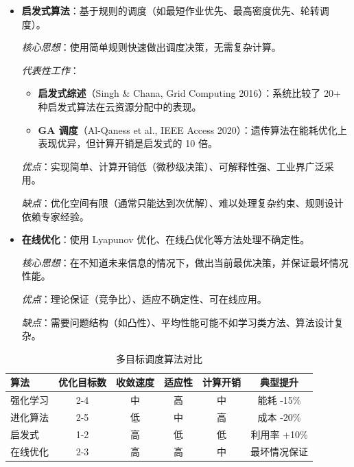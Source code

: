 \documentclass[12pt,a4paper]{article}
\begin{document}
\begin{itemize}
    \textit{优点}：可处理多目标、全局搜索能力强、不依赖梯度、可处理离散和连续变量。
    
    \textit{缺点}：计算开销大（需评估大量候选解）、收敛慢（通常需 100-1000 代）、难以在线应用、参数调优复杂。
    
    \item \textbf{启发式算法}：基于规则的调度（如最短作业优先、最高密度优先、轮转调度）。
    
    \textit{核心思想}：使用简单规则快速做出调度决策，无需复杂计算。
    
    \textit{代表性工作}：
    \begin{itemize}
        \item \textbf{启发式综述}（Singh \& Chana, Grid Computing 2016）：系统比较了 20+ 种启发式算法在云资源分配中的表现\cite{singh2016survey}。
        \item \textbf{GA 调度}（Al-Qaness et al., IEEE Access 2020）：遗传算法在能耗优化上表现优异，但计算开销是启发式的 10 倍\cite{alqaness2020energy}。
    \end{itemize}
    
    \textit{优点}：实现简单、计算开销低（微秒级决策）、可解释性强、工业界广泛采用。
    
    \textit{缺点}：优化空间有限（通常只能达到次优解）、难以处理复杂约束、规则设计依赖专家经验。
    
    \item \textbf{在线优化}：使用 Lyapunov 优化、在线凸优化等方法处理不确定性。
    
    \textit{核心思想}：在不知道未来信息的情况下，做出当前最优决策，并保证最坏情况性能。
    
    \textit{优点}：理论保证（竞争比）、适应不确定性、可在线应用。
    
    \textit{缺点}：需要问题结构（如凸性）、平均性能可能不如学习类方法、算法设计复杂。
\end{itemize}

\begin{table}[h]
\centering
\caption{多目标调度算法对比}
\label{tab:scheduling-algo}
\begin{tabular}{@{}lccccc@{}}
\toprule
\textbf{算法} & \textbf{优化目标数} & \textbf{收敛速度} & \textbf{适应性} & \textbf{计算开销} & \textbf{典型提升} \\
\midrule
强化学习 & 2-4 & 中 & 高 & 中 & 能耗 -15\% \\
进化算法 & 2-5 & 低 & 中 & 高 & 成本 -20\% \\
启发式 & 1-2 & 高 & 低 & 低 & 利用率 +10\% \\
在线优化 & 2-3 & 高 & 高 & 中 & 最坏情况保证 \\
\bottomrule
\end{tabular}
\end{table}
\end{document}
